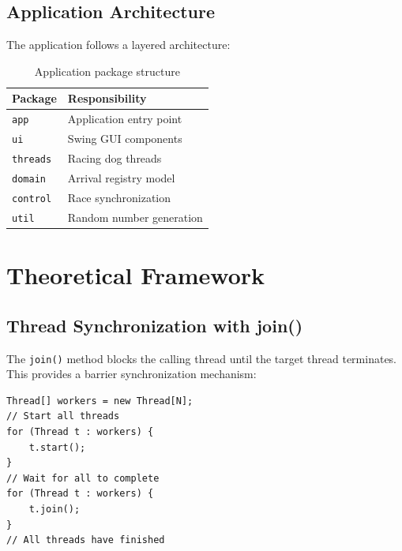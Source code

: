 \documentclass[10pt,a4paper,twocolumn]{article}
\begin{document}
\subsection{Application Architecture}

The application follows a layered architecture:

\begin{table}[H]
    \centering
    \small
    \begin{tabular}{|l|l|}
        \hline
        \textbf{Package} & \textbf{Responsibility} \\
        \hline
        \texttt{app} & Application entry point \\
        \hline
        \texttt{ui} & Swing GUI components \\
        \hline
        \texttt{threads} & Racing dog threads \\
        \hline
        \texttt{domain} & Arrival registry model \\
        \hline
        \texttt{control} & Race synchronization \\
        \hline
        \texttt{util} & Random number generation \\
        \hline
    \end{tabular}
    \caption{Application package structure}
    \label{tab:packages}
\end{table}

\section{Theoretical Framework}

\subsection{Thread Synchronization with join()}

The \texttt{join()} method blocks the calling thread until the target thread terminates. This provides a barrier synchronization mechanism:

\begin{lstlisting}[caption={Thread Barrier with join()}]
Thread[] workers = new Thread[N];
// Start all threads
for (Thread t : workers) {
    t.start();
}
// Wait for all to complete
for (Thread t : workers) {
    t.join();
}
// All threads have finished
\end{lstlisting}
\end{document}
